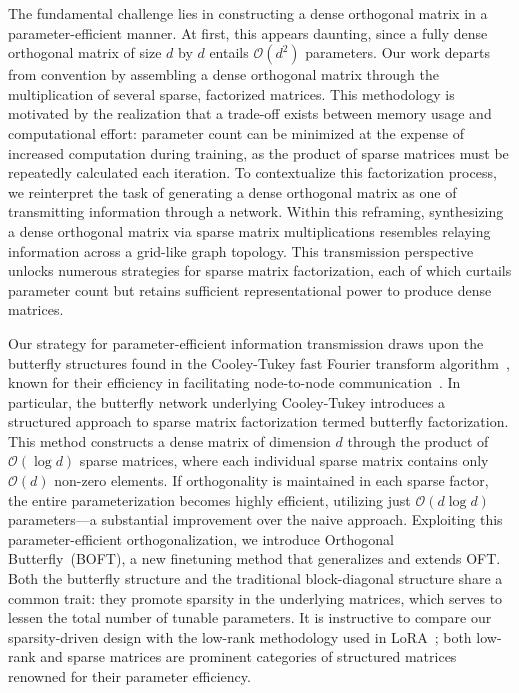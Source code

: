 The fundamental challenge lies in constructing a dense orthogonal matrix in a parameter-efficient manner. At first, this appears daunting, since a fully dense orthogonal matrix of size $d$ by $d$ entails $\mathcal{O}(d^2)$ parameters. Our work departs from convention by assembling a dense orthogonal matrix through the multiplication of several sparse, factorized matrices. This methodology is motivated by the realization that a trade-off exists between memory usage and computational effort: parameter count can be minimized at the expense of increased computation during training, as the product of sparse matrices must be repeatedly calculated each iteration. To contextualize this factorization process, we reinterpret the task of generating a dense orthogonal matrix as one of transmitting information through a network. Within this reframing, synthesizing a dense orthogonal matrix via sparse matrix multiplications resembles relaying information across a grid-like graph topology. This transmission perspective unlocks numerous strategies for sparse matrix factorization, each of which curtails parameter count but retains sufficient representational power to produce dense matrices.

Our strategy for parameter-efficient information transmission draws upon the butterfly structures found in the Cooley-Tukey fast Fourier transform algorithm~\cite{cooley1965algorithm}, known for their efficiency in facilitating node-to-node communication~\cite{klasing1994broadcasting}. In particular, the butterfly network underlying Cooley-Tukey introduces a structured approach to sparse matrix factorization termed butterfly factorization. This method constructs a dense matrix of dimension $d$ through the product of $\mathcal{O}(\log d)$ sparse matrices, where each individual sparse matrix contains only $\mathcal{O}(d)$ non-zero elements. If orthogonality is maintained in each sparse factor, the entire parameterization becomes highly efficient, utilizing just $\mathcal{O}(d\log d)$ parameters—a substantial improvement over the naive approach. Exploiting this parameter-efficient orthogonalization, we introduce Orthogonal Butterfly~(BOFT), a new finetuning method that generalizes and extends OFT. Both the butterfly structure and the traditional block-diagonal structure share a common trait: they promote sparsity in the underlying matrices, which serves to lessen the total number of tunable parameters. It is instructive to compare our sparsity-driven design with the low-rank methodology used in LoRA~\cite{hulora2022}; both low-rank and sparse matrices are prominent categories of structured matrices~\cite{candes2011robust} renowned for their parameter efficiency.


